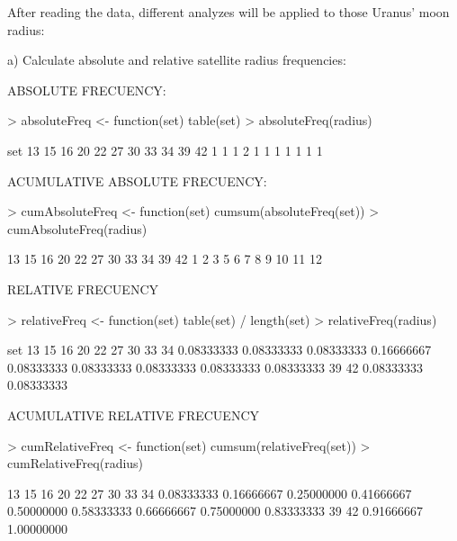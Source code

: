 \documentclass[a4paper]{article}
\begin{document}
After reading the data, different analyzes will be applied to those Uranus' moon radius:
	
		a) Calculate absolute and relative satellite radius frequencies:

ABSOLUTE FRECUENCY:
\begin{Schunk}
\begin{Sinput}
> absoluteFreq    <- function(set) {table(set)}
> absoluteFreq(radius)
\end{Sinput}
\begin{Soutput}
set
13 15 16 20 22 27 30 33 34 39 42 
 1  1  1  2  1  1  1  1  1  1  1 
\end{Soutput}
\end{Schunk}
ACUMULATIVE ABSOLUTE FRECUENCY:
\begin{Schunk}
\begin{Sinput}
> cumAbsoluteFreq <- function(set) {cumsum(absoluteFreq(set))}
> cumAbsoluteFreq(radius)
\end{Sinput}
\begin{Soutput}
13 15 16 20 22 27 30 33 34 39 42 
 1  2  3  5  6  7  8  9 10 11 12 
\end{Soutput}
\end{Schunk}
RELATIVE FRECUENCY
\begin{Schunk}
\begin{Sinput}
> relativeFreq <- function(set) {table(set) / length(set)}
> relativeFreq(radius)
\end{Sinput}
\begin{Soutput}
set
        13         15         16         20         22         27         30         33         34 
0.08333333 0.08333333 0.08333333 0.16666667 0.08333333 0.08333333 0.08333333 0.08333333 0.08333333 
        39         42 
0.08333333 0.08333333 
\end{Soutput}
\end{Schunk}
ACUMULATIVE RELATIVE FRECUENCY
\begin{Schunk}
\begin{Sinput}
> cumRelativeFreq <- function(set) {cumsum(relativeFreq(set))}
> cumRelativeFreq(radius)
\end{Sinput}
\begin{Soutput}
        13         15         16         20         22         27         30         33         34 
0.08333333 0.16666667 0.25000000 0.41666667 0.50000000 0.58333333 0.66666667 0.75000000 0.83333333 
        39         42 
0.91666667 1.00000000 
\end{Soutput}
\end{Schunk}
\end{document}
